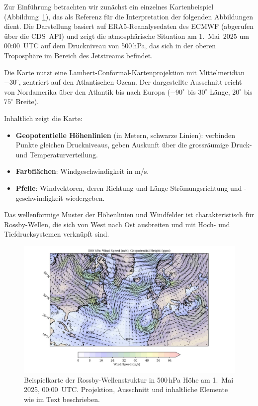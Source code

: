 Zur Einführung betrachten wir zunächst ein einzelnes Kartenbeispiel
(Abbildung~\ref{fig:rossby_atlantic_single}), das als Referenz für die Interpretation der
folgenden Abbildungen dient.
Die Darstellung basiert auf ERA5-Reanalysedaten des ECMWF (abgerufen über die CDS~API)
und zeigt die atmosphärische Situation am 1.\ Mai~2025 um 00:00~UTC auf dem Druckniveau
von 500\,hPa, das sich in der oberen Troposphäre im Bereich des Jetstreams befindet.


Die Karte nutzt eine Lambert-Conformal-Kartenprojektion mit Mittelmeridian \(-30^\circ\), zentriert auf den Atlantischen Ozean.
Der dargestellte Ausschnitt reicht von Nordamerika über den Atlantik bis nach Europa (\(-90^\circ\) bis \(30^\circ\) Länge, \(20^\circ\) bis \(75^\circ\) Breite).

Inhaltlich zeigt die Karte:
\begin{itemize}
	\item \textbf{Geopotentielle Höhenlinien} (in Metern, schwarze Linien): verbinden Punkte gleichen Druckniveaus, geben Auskunft über die grossräumige Druck- und Temperaturverteilung.
	\item \textbf{Farbflächen}: Windgeschwindigkeit in m/s.
	\item \textbf{Pfeile}: Windvektoren, deren Richtung und Länge Strömungsrichtung und -geschwindigkeit wiedergeben.
\end{itemize}

Das wellenförmige Muster der Höhenlinien und Windfelder ist charakteristisch für Rossby-Wellen, die sich von West nach Ost ausbreiten und mit Hoch- und Tiefdrucksystemen verknüpft sind.

\begin{figure}
	\centering
	\includegraphics[width=\textwidth, trim=2cm 0cm 3cm 0cm, clip]{papers/rossby/images/data_2025_5_1_00_00_500.jpg}
	\caption{Beispielkarte der Rossby-Wellenstruktur in 500\,hPa Höhe am 1.\ Mai 2025, 00:00~UTC.
		Projektion, Ausschnitt und inhaltliche Elemente wie im Text beschrieben.}
	\label{fig:rossby_atlantic_single}
\end{figure}

